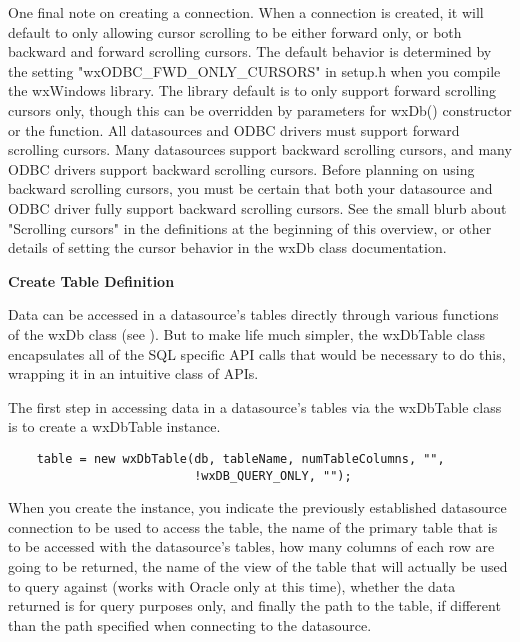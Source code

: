 One final note on creating a connection.  When a connection is created, it 
will default to only allowing cursor scrolling to be either forward only, 
or both backward and forward scrolling cursors.  The default behavior is 
determined by the setting "wxODBC_FWD_ONLY_CURSORS" in setup.h when you 
compile the wxWindows library.  The library default is to only support 
forward scrolling cursors only, though this can be overridden by parameters 
for wxDb() constructor or the  
function.  All datasources and ODBC drivers must support forward scrolling 
cursors.  Many datasources support backward scrolling cursors, and many 
ODBC drivers support backward scrolling cursors.  Before planning on using 
backward scrolling cursors, you must be certain that both your datasource 
and ODBC driver fully support backward scrolling cursors.  See the small 
blurb about "Scrolling cursors" in the definitions at the beginning of 
this overview, or other details of setting the cursor behavior in the wxDb 
class documentation.


{\bf Create Table Definition}

Data can be accessed in a datasource's tables directly through various 
functions of the wxDb class (see ).  But to make life much 
simpler, the wxDbTable class encapsulates all of the SQL specific API calls 
that would be necessary to do this, wrapping it in an intuitive class of APIs.

The first step in accessing data in a datasource's tables via the wxDbTable 
class is to create a wxDbTable instance.

\begin{verbatim}
    table = new wxDbTable(db, tableName, numTableColumns, "", 
                          !wxDB_QUERY_ONLY, "");
\end{verbatim}

When you create the instance, you indicate the previously established 
datasource connection to be used to access the table, the name of the 
primary table that is to be accessed with the datasource's tables, how many 
columns of each row are going to be returned, the name of the view of the 
table that will actually be used to query against (works with Oracle only 
at this time), whether the data returned is for query purposes only, and 
finally the path to the table, if different than the path specified when 
connecting to the datasource.

